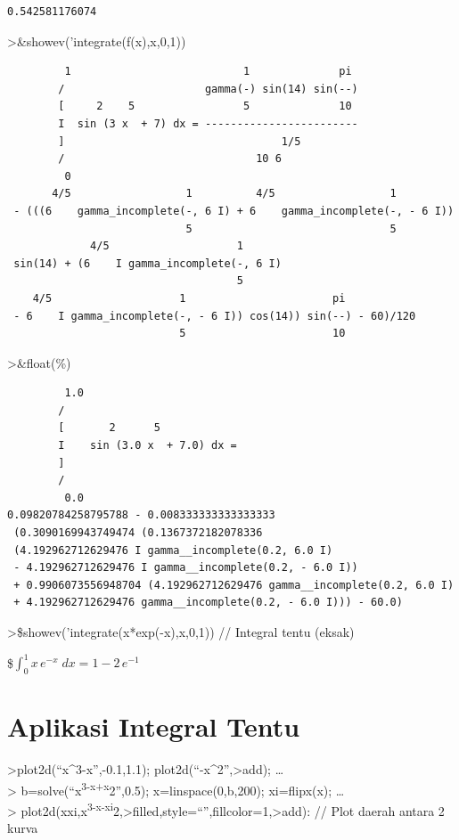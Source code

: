 \documentclass[
]{book}
\begin{document}
\begin{verbatim}
0.542581176074
\end{verbatim}

\textgreater\&showev('integrate(f(x),x,0,1))

\begin{verbatim}
         1                           1              pi
        /                      gamma(-) sin(14) sin(--)
        [     2    5                 5              10
        I  sin (3 x  + 7) dx = ------------------------
        ]                                  1/5
        /                              10 6
         0
       4/5                  1          4/5                  1
 - (((6    gamma_incomplete(-, 6 I) + 6    gamma_incomplete(-, - 6 I))
                            5                               5
             4/5                    1
 sin(14) + (6    I gamma_incomplete(-, 6 I)
                                    5
    4/5                    1                       pi
 - 6    I gamma_incomplete(-, - 6 I)) cos(14)) sin(--) - 60)/120
                           5                       10
\end{verbatim}

\textgreater\&float(\%)

\begin{verbatim}
         1.0
        /
        [       2      5
        I    sin (3.0 x  + 7.0) dx = 
        ]
        /
         0.0
0.09820784258795788 - 0.008333333333333333
 (0.3090169943749474 (0.1367372182078336
 (4.192962712629476 I gamma__incomplete(0.2, 6.0 I)
 - 4.192962712629476 I gamma__incomplete(0.2, - 6.0 I))
 + 0.9906073556948704 (4.192962712629476 gamma__incomplete(0.2, 6.0 I)
 + 4.192962712629476 gamma__incomplete(0.2, - 6.0 I))) - 60.0)
\end{verbatim}

\textgreater\$showev('integrate(x*exp(-x),x,0,1)) // Integral tentu (eksak)

\$\(\int_{0}^{1}{x\,e^ {- x }\;dx}=1-2\,e^ {- 1 }\)

\section{Aplikasi Integral Tentu}\label{aplikasi-integral-tentu}

\textgreater plot2d(``x\^{}3-x'',-0.1,1.1); plot2d(``-x\^{}2'',\textgreater add); \ldots{}\\
\textgreater{} b=solve(``x\textsuperscript{3-x+x}2'',0.5); x=linspace(0,b,200); xi=flipx(x); \ldots{}\\
\textgreater{} plot2d(x\textbar xi,x\textsuperscript{3-x\textbar-xi}2,\textgreater filled,style=``\textbar{}'',fillcolor=1,\textgreater add): // Plot daerah antara 2 kurva
\end{document}
